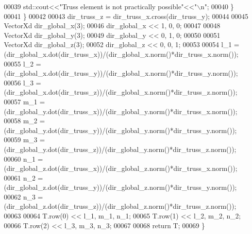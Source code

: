 \begin{DoxyCode}
00039             std::cout<<\textcolor{stringliteral}{"Truss element is not practically possible"}<<\textcolor{stringliteral}{"\(\backslash\)n"};
00040         \}
00041     \}
00042     
00043     dir\_truss\_z = dir\_truss\_x.cross(dir\_truss\_y);
00044 
00045     VectorXd dir\_global\_x(3);
00046     dir\_global\_x << 1, 0, 0;
00047     
00048     VectorXd dir\_global\_y(3);
00049     dir\_global\_y << 0, 1, 0;
00050 
00051     VectorXd dir\_global\_z(3);
00052     dir\_global\_z << 0, 0, 1;
00053 
00054     l\_1 = (dir\_global\_x.dot(dir\_truss\_x))/(dir\_global\_x.norm()*dir\_truss\_x.norm());
00055     l\_2 = (dir\_global\_x.dot(dir\_truss\_y))/(dir\_global\_x.norm()*dir\_truss\_y.norm());
00056     l\_3 = (dir\_global\_x.dot(dir\_truss\_z))/(dir\_global\_x.norm()*dir\_truss\_z.norm()); 
00057     m\_1 = (dir\_global\_y.dot(dir\_truss\_x))/(dir\_global\_y.norm()*dir\_truss\_x.norm()); 
00058     m\_2 = (dir\_global\_y.dot(dir\_truss\_y))/(dir\_global\_y.norm()*dir\_truss\_y.norm());
00059     m\_3 = (dir\_global\_y.dot(dir\_truss\_z))/(dir\_global\_y.norm()*dir\_truss\_z.norm());
00060     n\_1 = (dir\_global\_z.dot(dir\_truss\_x))/(dir\_global\_z.norm()*dir\_truss\_x.norm());
00061     n\_2 = (dir\_global\_z.dot(dir\_truss\_y))/(dir\_global\_z.norm()*dir\_truss\_y.norm());
00062     n\_3 = (dir\_global\_z.dot(dir\_truss\_z))/(dir\_global\_z.norm()*dir\_truss\_z.norm());
00063 
00064     T.row(0) << l\_1, m\_1, n\_1;
00065     T.row(1) << l\_2, m\_2, n\_2;
00066     T.row(2) << l\_3, m\_3, n\_3;
00067 
00068     \textcolor{keywordflow}{return} T;
00069 \}
\end{DoxyCode}
